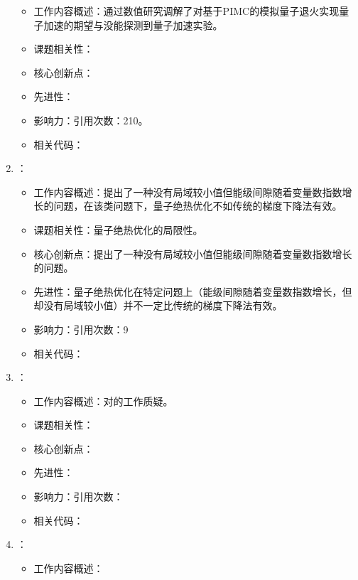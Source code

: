 \begin{enumerate}
            \begin{itemize}
                \item 工作内容概述：通过数值研究调解了\citet{santoro2002theory}对基于PIMC的模拟量子退火实现量子加速的期望与\citet{ronnow2014defining}没能探测到量子加速实验。
                \item 课题相关性：
                \item 核心创新点：
                \item 先进性：
                \item 影响力：引用次数：210。
                \item 相关代码：
            \end{itemize}
            \item \citet{jarret2015adiabatic}：
            \begin{itemize}
                \item 工作内容概述：提出了一种没有局域较小值但能级间隙随着变量数指数增长的问题，在该类问题下，量子绝热优化不如传统的梯度下降法有效。
                \item 课题相关性：量子绝热优化的局限性。
                \item 核心创新点：提出了一种没有局域较小值但能级间隙随着变量数指数增长的问题。
                \item 先进性：量子绝热优化在特定问题上（能级间隙随着变量数指数增长，但却没有局域较小值）并不一定比传统的梯度下降法有效。
                \item 影响力：引用次数：9
                \item 相关代码：
            \end{itemize}
            \item \citet{liu2015quantum}：
            \begin{itemize}
                \item 工作内容概述：对\citet{boixo2014evidence}的工作质疑。
                \item 课题相关性：
                \item 核心创新点：
                \item 先进性：
                \item 影响力：引用次数：
                \item 相关代码：
            \end{itemize}
            \item \citet{knysh2016zero}：
            \begin{itemize}
                \item 工作内容概述：

\end{itemize}
\end{enumerate}
